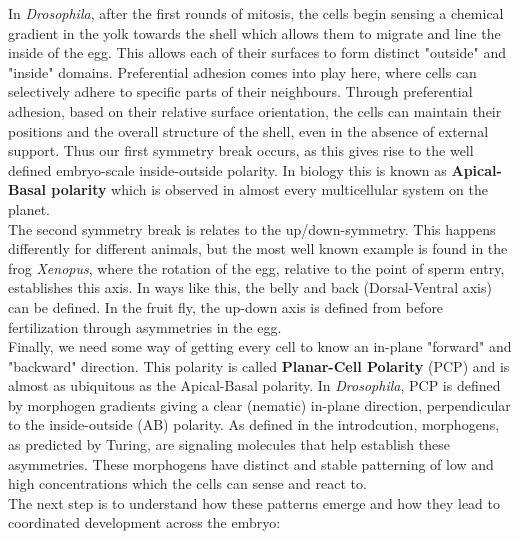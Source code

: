 In \textit{Drosophila}, after the first rounds of mitosis, the cells begin sensing a chemical gradient in the yolk towards the shell which allows them to migrate and line the inside of the egg. This allows each of their surfaces to form distinct "outside" and "inside" domains. 
Preferential adhesion comes into play here, where cells can selectively adhere to specific parts of their neighbours. 
Through preferential adhesion, based on their relative surface orientation, the cells can maintain their positions and the overall structure of the shell, even in the absence of external support.
Thus our first symmetry break occurs, as this gives rise to the well defined embryo-scale inside-outside polarity. In biology this is known as \textbf{Apical-Basal polarity} which is observed in almost every multicellular system on the planet.\\

The second symmetry break is relates to the up/down-symmetry. This happens differently for different animals, but the most well known example is found in the frog \textit{Xenopus}, where the rotation of the egg, relative to the point of sperm entry, establishes this axis. In ways like this, the belly and back (Dorsal-Ventral axis) can be defined. In the fruit fly, the up-down axis is defined from before fertilization through asymmetries in the egg.\\ 

Finally, we need some way of getting every cell to know an in-plane "forward" and "backward" direction. This polarity is called \textbf{Planar-Cell Polarity} (PCP) and is almost as ubiquitous as the Apical-Basal polarity. In \textit{Drosophila}, PCP is defined by morphogen gradients giving a clear (nematic) in-plane direction, perpendicular to the inside-outside (AB) polarity. As defined in the introdcution, morphogens, as predicted by Turing, are signaling molecules that help establish these asymmetries. These morphogens have distinct and stable patterning of low and high concentrations which the cells can sense and react to.\\
The next step is to understand how these patterns emerge and how they lead to coordinated development across the embryo:





